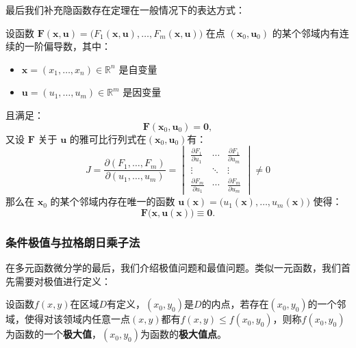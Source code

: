 \documentclass{ctexart}
\let\oldtextbf\textbf %
\renewcommand{\textbf}[1]{\textcolor{btex}{\oldtextbf{#1}}} %
\begin{document}
最后我们补充隐函数存在定理在一般情况下的表达方式：
\begin{tcolorbox}[
    colback=bac1,     %
    colframe=fra1,   %
    coltitle=white,             %
    coltext=tex1,
    title=隐函数存在定理(m方程，m+n未知数),
    fonttitle=\bfseries,        %
arc=3mm,                     %
breakable
]
设函数 \( \bm{F}(\bm{x}, \bm{u}) = \big(F_1(\bm{x}, \bm{u}), \dots, F_m(\bm{x}, \bm{u})\big) \) 在点 \( (\bm{x}_0, \bm{u}_0) \) 的某个邻域内有连续的一阶偏导数，其中：
\begin{itemize}
    \item \( \bm{x} = (x_1, \dots, x_n) \in \mathbb{R}^n \) 是自变量
    \item \( \bm{u} = (u_1, \dots, u_m) \in \mathbb{R}^m \) 是因变量
\end{itemize}
且满足：
\[
\bm{F}(\bm{x}_0, \bm{u}_0) = \bm{0},
\]
又设 \( \bm{F} \) 关于 \( \bm{u} \) 的雅可比行列式在$(\bm{x}_0, \bm{u}_0)$有：
\[
J = \frac{\partial(F_1, \dots, F_m)}{\partial(u_1, \dots, u_m)} = 
\begin{vmatrix}
\frac{\partial F_1}{\partial u_1} & \cdots & \frac{\partial F_1}{\partial u_m} \\
\vdots & \ddots & \vdots \\
\frac{\partial F_m}{\partial u_1} & \cdots & \frac{\partial F_m}{\partial u_m}
\end{vmatrix} \neq 0\tag{7-20} 
\]
那么在 \( \bm{x}_0 \) 的某个邻域内存在唯一的函数 \( \bm{u}(\bm{x}) = \big(u_1(\bm{x}), \dots, u_m(\bm{x})\big) \) 使得：
\[
\bm{F}\big(\bm{x}, \bm{u}(\bm{x})\big) \equiv \bm{0}.
\]
\end{tcolorbox}

\subsubsection{条件极值与拉格朗日乘子法}
在多元函数微分学的最后，我们介绍极值问题和最值问题。类似一元函数，我们首先需要对极值进行定义：
\begin{tcolorbox}[
    colback=bac2,     %
    colframe=fra2,   %
    coltitle=white,             %
    coltext=tex2,
    title=二元函数的极值,
    fonttitle=\bfseries,        %
arc=3mm,                     %
breakable
]
设函数$f(x,y)$在区域$D$有定义，$(x_0,y_0)$是$D$的内点，若存在$(x_0,y_0)$的一个邻域，使得对该领域内任意一点$(x,y)$都有$f(x,y)\leq f(x_0,y_0)$，则称$f(x_0,y_0)$为函数的一个\textbf{极大值}，$(x_0,y_0)$为函数的\textbf{极大值点}。
\end{tcolorbox}
\end{document}
